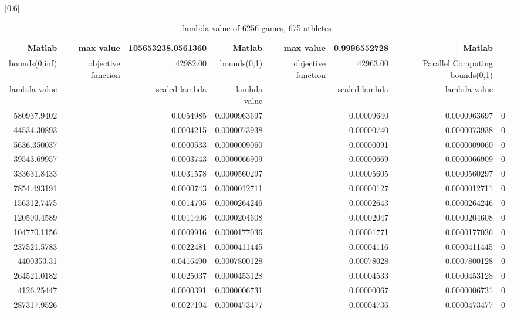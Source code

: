 \documentclass[
journal=jacsat, %
manuscript=article]{achemso}
\begin{document}
\begin{table}[htbp]
  \centering
  \caption{lambda value of 6256 games, 675 athletes}
  \scalebox{0.6}[0.6]{%
    \begin{tabular}{rrrrrrrr}
    \toprule
        Matlab & max value & 105653238.0561360 & Matlab & max value & 0.9996552728 & Matlab \\
    \hline
    bounds(0,inf) & objective function & 42982.00 & bounds(0,1) & objective function & 42963.00 &  Parallel Computing bounds(0,1) \\
    \hline
    lambda value &       & scaled lambda & lambda value  &       & scaled lambda & lambda value  \\
    \bottomrule
    580937.9402 &       & 0.0054985 & 0.0000963697 &       & 0.00009640 & 0.0000963697 & 0 \\
    44534.30893 &       & 0.0004215 & 0.0000073938 &       & 0.00000740 & 0.0000073938 & 0 \\
    5636.350037 &       & 0.0000533 & 0.0000009060 &       & 0.00000091 & 0.0000009060 & 0 \\
    39543.69957 &       & 0.0003743 & 0.0000066909 &       & 0.00000669 & 0.0000066909 & 0 \\
    333631.8433 &       & 0.0031578 & 0.0000560297 &       & 0.00005605 & 0.0000560297 & 0 \\
    7854.493191 &       & 0.0000743 & 0.0000012711 &       & 0.00000127 & 0.0000012711 & 0 \\
    156312.7475 &       & 0.0014795 & 0.0000264246 &       & 0.00002643 & 0.0000264246 & 0 \\
    120509.4589 &       & 0.0011406 & 0.0000204608 &       & 0.00002047 & 0.0000204608 & 0 \\
    104770.1156 &       & 0.0009916 & 0.0000177036 &       & 0.00001771 & 0.0000177036 & 0 \\
    237521.5783 &       & 0.0022481 & 0.0000411445 &       & 0.00004116 & 0.0000411445 & 0 \\
    4400353.31 &       & 0.0416490 & 0.0007800128 &       & 0.00078028 & 0.0007800128 & 0 \\
    264521.0182 &       & 0.0025037 & 0.0000453128 &       & 0.00004533 & 0.0000453128 & 0 \\
    4126.25447 &       & 0.0000391 & 0.0000006731 &       & 0.00000067 & 0.0000006731 & 0 \\
    287317.9526 &       & 0.0027194 & 0.0000473477 &       & 0.00004736 & 0.0000473477 & 0 \\

\end{tabular}}
\end{table}
\end{document}

